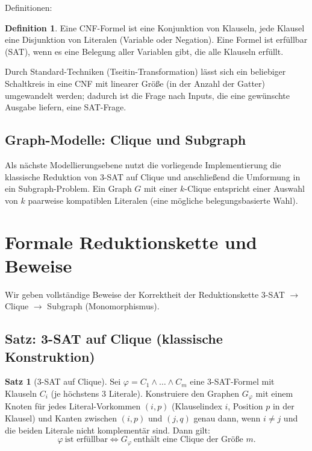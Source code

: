 \documentclass[a4paper,12pt]{article}
\theoremstyle{definition}
\newtheorem{definition}{Definition}[section]
\newtheorem{satz}{Satz}[section]
\begin{document}
Definitionen:
\begin{definition}
Eine CNF-Formel ist eine Konjunktion von Klauseln, jede Klausel eine Disjunktion von Literalen (Variable oder Negation). Eine Formel ist erfüllbar (SAT), wenn es eine Belegung aller Variablen gibt, die alle Klauseln erfüllt.
\end{definition}

Durch Standard-Techniken (Tseitin-Transformation) lässt sich ein beliebiger Schaltkreis in eine CNF mit linearer Größe (in der Anzahl der Gatter) umgewandelt werden; dadurch ist die Frage nach Inputs, die eine gewünschte Ausgabe liefern, eine SAT-Frage.

\subsection{Graph-Modelle: Clique und Subgraph}
Als nächste Modellierungsebene nutzt die vorliegende Implementierung die klassische Reduktion von 3-SAT auf Clique und anschließend die Umformung in ein Subgraph-Problem. Ein Graph $G$ mit einer $k$-Clique entspricht einer Auswahl von $k$ paarweise kompatiblen Literalen (eine mögliche belegungsbasierte Wahl).

\section{Formale Reduktionskette und Beweise}
\label{ch:reductions}

Wir geben vollständige Beweise der Korrektheit der Reduktionskette 3-SAT $\to$ Clique $\to$ Subgraph (Monomorphismus).

\subsection{Satz: 3-SAT auf Clique (klassische Konstruktion)}
\begin{satz}[3-SAT auf Clique]
Sei $\varphi = C_1 \wedge \dots \wedge C_m$ eine 3-SAT-Formel mit Klauseln $C_i$ (je höchstens 3 Literale). Konstruiere den Graphen $G_\varphi$ mit einem Knoten für jedes Literal-Vorkommen $(i,p)$ (Klauselindex $i$, Position $p$ in der Klausel) und Kanten zwischen $(i,p)$ und $(j,q)$ genau dann, wenn $i\neq j$ und die beiden Literale nicht komplementär sind. Dann gilt:
\[
\varphi\ \text{ist erfüllbar} \iff G_\varphi\ \text{enthält eine Clique der Größe } m.
\]
\end{satz}
\end{document}
